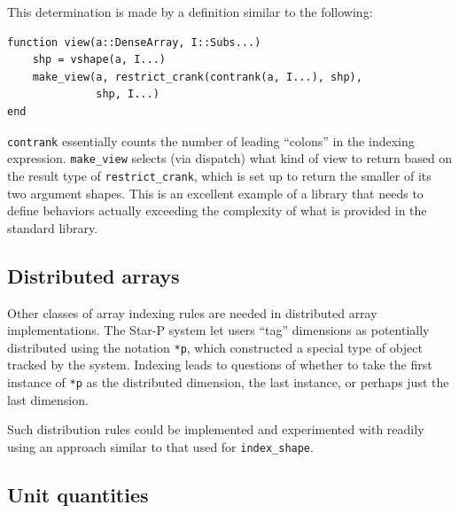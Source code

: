 \documentclass[preprint]{sigplanconf}
\newcommand{\code}[1]{\texttt{#1}}
\begin{document}
This determination is made by a definition similar to the following:

\begin{minipage}{\linewidth}
{\small
\begin{verbatim}
function view(a::DenseArray, I::Subs...)
    shp = vshape(a, I...)
    make_view(a, restrict_crank(contrank(a, I...), shp),
              shp, I...)
end

\end{verbatim}
}
\end{minipage}

\code{contrank} essentially counts the number of leading ``colons'' in the
indexing expression. \code{make\_view} selects (via dispatch) what kind of
view to return based on the result type of \code{restrict\_crank}, which is
set up to return the smaller of its two argument shapes.
This is an excellent example of a library that needs to define behaviors
actually exceeding the complexity of what is provided in the standard library.

\subsection{Distributed arrays}

Other classes of array indexing rules are needed in distributed array
implementations. The Star-P system \cite{parry, Choy05parallelmatlab}
let users ``tag'' dimensions as potentially distributed using the notation
\code{*p}, which constructed a special type of object tracked by the system.
Indexing leads to questions of whether to take the first instance of \code{*p}
as the distributed dimension, the last instance, or perhaps just the last dimension.

Such distribution rules could be implemented and experimented with readily
using an approach similar to that used for \code{index\_shape}.



\subsection{Unit quantities}
\end{document}
